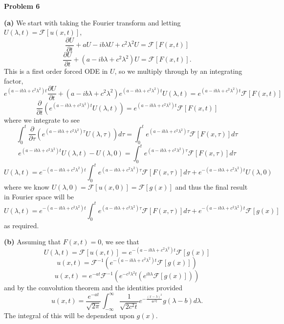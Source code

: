 \documentclass[10pt]{article}
\newcommand{\fo}{\mathcal{F}}
\begin{document}
\newpage
\textbf{Problem 6}

\textbf{(a)}
We start with taking the Fourier transform and letting $U(\lambda,t) = \fo[u(x,t)]$,
$$\frac{\partial U}{\partial t} + aU - ib\lambda U + c^{2}\lambda^{2}U = \fo[F(x,t)]$$
$$\frac{\partial U}{\partial t} + \left(a - ib\lambda + c^{2}\lambda^{2}\right)U = \fo[F(x,t)].$$
This is a first order forced ODE in $U$, so we multiply through by an integrating factor,
$$e^{(a - ib\lambda + c^{2}\lambda^{2})t}\frac{\partial U}{\partial t} + \left(a - ib\lambda + c^{2}\lambda^{2}\right)e^{(a - ib\lambda + c^{2}\lambda^{2})t}U(\lambda,t) = e^{(a - ib\lambda + c^{2}\lambda^{2})t}\fo[F(x,t)]$$
$$\frac{\partial}{\partial t}\left(e^{(a - ib\lambda + c^{2}\lambda^{2})t}U(\lambda,t)\right) =  e^{(a - ib\lambda + c^{2}\lambda^{2})t}\fo[F(x,t)]$$
where we integrate to see
$$\int_{0}^{t}\frac{\partial}{\partial \tau}\left(e^{(a - ib\lambda + c^{2}\lambda^{2})\tau}U(\lambda,\tau)\right)d\tau = \int_{0}^{t}e^{(a - ib\lambda + c^{2}\lambda^{2})\tau}\fo[F(x,\tau)]d\tau$$
$$e^{(a - ib\lambda + c^{2}\lambda^{2})t}U(\lambda,t) - U(\lambda,0) =  \int_{0}^{t}e^{(a - ib\lambda + c^{2}\lambda^{2})\tau}\fo[F(x,\tau)]d\tau$$
$$U(\lambda,t) = e^{-(a - ib\lambda + c^{2}\lambda^{2})t}\int_{0}^{t}e^{(a - ib\lambda + c^{2}\lambda^{2})\tau}\fo[F(x,\tau)]d\tau + e^{-(a - ib\lambda + c^{2}\lambda^{2})t}U(\lambda,0)$$
where we know $U(\lambda, 0) = \fo[u(x,0)] = \fo[g(x)]$ and thus the final result in Fourier space will be
$$U(\lambda, t) = e^{-(a - ib\lambda + c^{2}\lambda^{2})t}\int_{0}^{t}e^{(a - ib\lambda + c^{2}\lambda^{2})\tau}\fo[F(x,\tau)]d\tau + e^{-(a - ib\lambda + c^{2}\lambda^{2})t}\fo[g(x)]$$
as required.

\textbf{(b)}
Assuming that $F(x,t) = 0$, we see that
$$U(\lambda,t) = \fo[u(x,t)] = e^{-(a - ib\lambda + c^{2}\lambda^{2})t}\fo[g(x)]$$
$$u(x,t) = \fo^{-1}\left(e^{-(a - ib\lambda + c^{2}\lambda^{2})t}\fo[g(x)]\right)$$
$$u(x,t) = e^{-at}\fo^{-1}\left(e^{-c^{2}\lambda^{2}t}\left(e^{ib\lambda}\fo[g(x)]\right)\right)$$
and by the convolution theorem and the identities provided
$$u(x,t) = \frac{e^{-at}}{\sqrt{2\pi}}\int_{-\infty}^{\infty}\frac{1}{\sqrt{2c^{2}t}}e^{-\frac{(x-\lambda)^{2}}{4c^{2}t}}g(\lambda - b)d\lambda.$$
The integral of this will be dependent upon $g(x)$.
\end{document}
